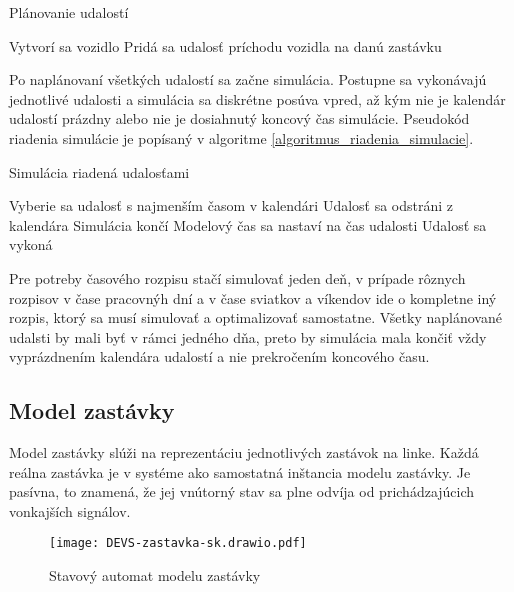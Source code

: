 \vspace*{\dimexpr 0.5\baselineskip\relax}
\begin{algorithm}[H]
  \label{algoritmus_planovanie_udalosti}
  \caption{Plánovanie udalostí}
     {
      Vytvorí sa vozidlo\;
       {
        Pridá sa udalosť príchodu vozidla na danú zastávku\;
      }
    }
\end{algorithm}
\vspace*{\dimexpr 0.5\baselineskip\relax}

Po naplánovaní všetkých udalostí sa začne simulácia.
Postupne sa vykonávajú jednotlivé udalosti a simulácia sa diskrétne posúva vpred, až kým nie je kalendár udalostí prázdny alebo nie je dosiahnutý koncový čas simulácie.
Pseudokód riadenia simulácie je popísaný v algoritme \ref{algoritmus_riadenia_simulacie}.

\vspace*{\dimexpr 0.5\baselineskip\relax}
\begin{algorithm}[H]
\label{algoritmus_riadenia_simulacie}
\caption{Simulácia riadená udalosťami}
   {
    Vyberie sa udalosť s najmenším časom v kalendári\;
    Udalosť sa odstráni z kalendára\;
     {
      Simulácia končí\;
    }
    Modelový čas sa nastaví na čas udalosti\;
    Udalosť sa vykoná\;
  }
\end{algorithm}
\vspace*{\dimexpr 0.5\baselineskip\relax}

Pre potreby časového rozpisu stačí simulovať jeden deň, v prípade rôznych rozpisov v čase pracovnýh dní a v čase sviatkov a víkendov ide o kompletne iný rozpis, ktorý sa musí simulovať a optimalizovať samostatne.
Všetky naplánované udalsti by mali byť v rámci jedného dňa, preto by simulácia mala končiť vždy vyprázdnením kalendára udalostí a nie prekročením koncového času.

\subsection*{Model zastávky}
\label{model_zastavky}

Model zastávky slúži na reprezentáciu jednotlivých zastávok na linke.
Každá reálna zastávka je v systéme ako samostatná inštancia modelu zastávky.
Je pasívna, to znamená, že jej vnútorný stav sa plne odvíja od prichádzajúcich vonkajších signálov.

\begin{figure}[h]
  \label{fig:model_zastavky}
  \centering
  \texttt{[image: DEVS-zastavka-sk.drawio.pdf]}
  \caption{Stavový automat modelu zastávky}
\end{figure}

